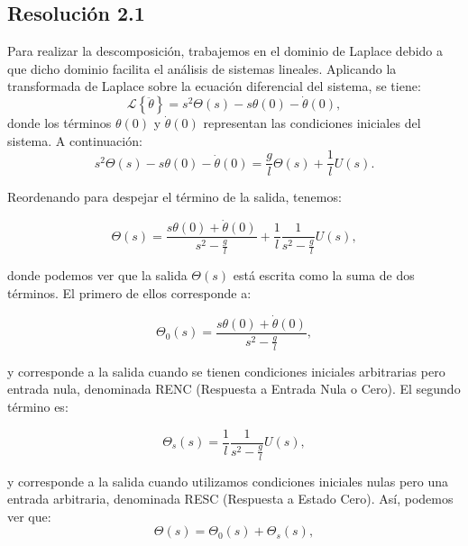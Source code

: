 \documentclass[
  11pt,
  letterpaper,
   addpoints,
   answers
  ]{exam}
\begin{document}
\begin{questions}
\begin{solution}
\subsection*{Resolución 2.1}
Para realizar la descomposición, trabajemos en el dominio de Laplace debido a que dicho dominio facilita el análisis de sistemas lineales. Aplicando la transformada de Laplace sobre la ecuación diferencial del sistema, se tiene:
\begin{equation}
\mathcal{L}\left\{ \ddot{\theta} \right\} = s^2\Theta(s) - s\theta(0) - \dot{\theta}(0),
\end{equation}
donde los términos $\theta(0)$ y $\dot{\theta}(0)$ representan las condiciones iniciales del sistema. A continuación:
\begin{equation}
s^2\Theta(s) - s\theta(0) - \dot{\theta}(0) = \frac{g}{l} \Theta(s) + \frac{1}{l} U(s).
\end{equation}

Reordenando para despejar el término de la salida, tenemos:

\begin{equation}
\Theta(s) = \frac{s\theta(0) + \dot{\theta}(0)}{s^2 - \frac{g}{l}} + \frac{1}{l} \frac{1}{s^2 - \frac{g}{l}} U(s),
\end{equation}

donde podemos ver que la salida \(\Theta(s)\) está escrita como la suma de dos términos. El primero de ellos corresponde a:

\begin{equation}
\Theta_0(s) = \frac{s\theta(0) + \dot{\theta}(0)}{s^2 - \frac{g}{l}},
\end{equation}

y corresponde a la salida cuando se tienen condiciones iniciales arbitrarias pero entrada nula, denominada RENC (Respuesta a Entrada Nula o Cero). El segundo término es:

\begin{equation}
\Theta_s(s) = \frac{1}{l} \frac{1}{s^2 - \frac{g}{l}} U(s),
\end{equation}

y corresponde a la salida cuando utilizamos condiciones iniciales nulas pero una entrada arbitraria, denominada RESC (Respuesta a Estado Cero). Así, podemos ver que:
\begin{equation}
\Theta(s) = \Theta_0(s) + \Theta_s(s),
\end{equation}


\end{solution}
\end{questions}
\end{document}
